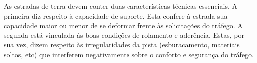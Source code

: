 
As estradas de terra devem conter duas características técnicas essenciais. A primeira diz respeito à capacidade de suporte. Esta confere à estrada sua capacidade maior ou menor de se deformar frente às solicitações do tráfego. A segunda está vinculada às boas condições de rolamento e aderência. Estas, por sua vez, dizem respeito às irregularidades da pista (esburacamento, materiais soltos, etc) que interferem negativamente sobre o conforto e segurança do tráfego.